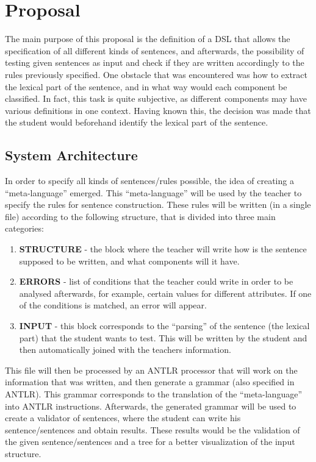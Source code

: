 \chapter{Proposal} \label{proposal}

The main purpose of this proposal is the definition of a \textsc{DSL} that allows the specification of all different kinds of sentences, and afterwards, the possibility of testing given sentences as input and check if they are written accordingly to the rules previously specified. One obstacle that was encountered was how to extract the lexical part of the sentence, and in what way would each component be classified. In fact, this task is quite subjective, as different components may have various definitions in one context. %
Having known this, the decision was made that the student would beforehand identify the lexical part of the sentence.


\section{System Architecture}
In order to specify all kinds of sentences/rules possible, the idea of creating a ``meta-language'' emerged. This ``meta-language'' will be used by the teacher to specify the rules for sentence construction. 
These rules will be written (in a single file) according to the following structure, that is divided into three main categories:

\begin{enumerate}
    \item \textbf{STRUCTURE} - the block where the teacher will write how is the sentence supposed to be written, and what components will it have.
    
    \item \textbf{ERRORS} - list of conditions that the teacher could write in order to be analysed afterwards, for example, certain values for different attributes. If one of the conditions is matched, an error will appear.
    
    \item \textbf{INPUT} - this block corresponds to the ``parsing'' of the sentence (the lexical part) that the student wants to test. This will be written by the student and then automatically joined with the teachers information.
\end{enumerate}

This file will then be processed by an \textsc{ANTLR} processor that will work on the information that was written, and then generate a grammar (also specified in \textsc{ANTLR}). This grammar corresponds to the translation of the
``meta-language'' into \textsc{ANTLR} instructions. Afterwards, the generated grammar will be used to create a validator of sentences, where the student can write his sentence/sentences and obtain results. 
These results would be the validation of the given sentence/sentences and a tree for a better visualization of the input structure.

